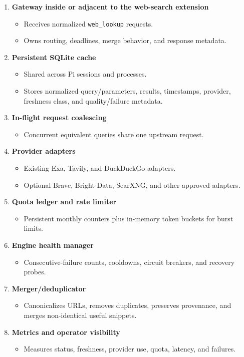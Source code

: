 \documentclass[11pt]{article}
\begin{document}
\begin{enumerate}
\item \textbf{Gateway inside or adjacent to the web-search extension}
\begin{itemize}
\item Receives normalized \texttt{web\_lookup} requests.
\item Owns routing, deadlines, merge behavior, and response metadata.
\end{itemize}
\item \textbf{Persistent SQLite cache}
\begin{itemize}
\item Shared across Pi sessions and processes.
\item Stores normalized query/parameters, results, timestamps, provider,
freshness class, and quality/failure metadata.
\end{itemize}
\item \textbf{In-flight request coalescing}
\begin{itemize}
\item Concurrent equivalent queries share one upstream request.
\end{itemize}
\item \textbf{Provider adapters}
\begin{itemize}
\item Existing Exa, Tavily, and DuckDuckGo adapters.
\item Optional Brave, Bright Data, SearXNG, and other approved adapters.
\end{itemize}
\item \textbf{Quota ledger and rate limiter}
\begin{itemize}
\item Persistent monthly counters plus in-memory token buckets for burst limits.
\end{itemize}
\item \textbf{Engine health manager}
\begin{itemize}
\item Consecutive-failure counts, cooldowns, circuit breakers, and recovery
probes.
\end{itemize}
\item \textbf{Merger/deduplicator}
\begin{itemize}
\item Canonicalizes URLs, removes duplicates, preserves provenance, and merges
non-identical useful snippets.
\end{itemize}
\item \textbf{Metrics and operator visibility}
\begin{itemize}
\item Measures status, freshness, provider use, quota, latency, and failures.
\end{itemize}
\end{enumerate}
\end{document}
